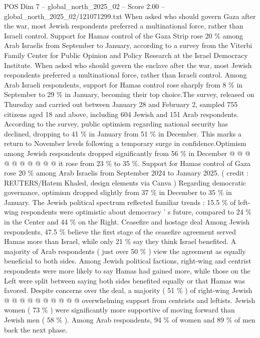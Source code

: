 \begin{textsample}{POS Dim 7 – global\_north\_2025\_02 – Score 2.00 – global\_north\_2025\_02/121071299.txt}  \label{ex:f7_pos_386}
When asked who should govern Gaza after the war, most Jewish respondents preferred a multinational force, rather than Israeli control.
Support for Hamas control of the Gaza Strip rose 20 \% among Arab Israelis from September to January, according to a survey from the Viterbi Family Center for Public Opinion and Policy Research at the Israel Democracy Institute.
When asked who should govern the enclave after the war, most Jewish respondents preferred a multinational force, rather than Israeli control.
Among Arab Israeli respondents, support for Hamas control rose sharply from 8 \% in September to 29 \% in January, becoming their top choice.The survey, released on Thursday and carried out between January 28 and February 2, sampled 755 citizens aged 18 and above, including 604 Jewish and 151 Arab respondents.
According to the survey, public optimism regarding national security has declined, dropping to 41 \% in January from 51 \% in December.
This marks a return to November levels following a temporary surge in confidence.Optimism among Jewish respondents dropped significantly from 56 \% in December @ @ @ @ @ @ @ @ @ @ it rose from 23 \% to 35 \%.
Support for Hamas control of Gaza rose 20 \% among Arab Israelis from September 2024 to January 2025. ( credit : REUTERS/Hatem Khaled, design elements via Canva ) Regarding democratic governance, optimism dropped slightly from 37 \% in December to 35 \% in January.
The Jewish political spectrum reflected familiar trends : 15.5 \% of left-wing respondents were optimistic about democracy ' s future, compared to 24 \% in the Center and 44 \% on the Right.
Ceasefire and hostage deal Among Jewish respondents, 47.5 \% believe the first stage of the ceasefire agreement served Hamas more than Israel, while only 21 \% say they think Israel benefited.
A majority of Arab respondents ( just over 50 \% ) view the agreement as equally beneficial to both sides.
Among Jewish political factions, right-wing and centrist respondents were more likely to say Hamas had gained more, while those on the Left were split between saying both sides benefited equally or that Hamas was favored.
Despite concerns over the deal, a majority ( 51 \% ) of right-wing Jewish @ @ @ @ @ @ @ @ @ @ overwhelming support from centrists and leftists.
Jewish women ( 73 \% ) were significantly more supportive of moving forward than Jewish men ( 58 \% ).
Among Arab respondents, 94 \% of women and 89 \% of men back the next phase.

\end{textsample}
